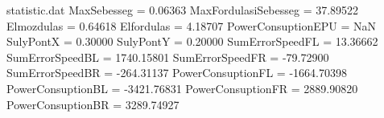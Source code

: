 \begin{filecontents*}{statistic.dat}
MaxSebesseg =    0.06363
MaxFordulasiSebesseg =   37.89522
Elmozdulas =    0.64618
Elfordulas =    4.18707
PowerConsuptionEPU =        NaN
SulyPontX =    0.30000
SulyPontY =    0.20000
SumErrorSpeedFL =   13.36662
SumErrorSpeedBL = 1740.15801
SumErrorSpeedFR =  -79.72900
SumErrorSpeedBR = -264.31137
PowerConsuptionFL = -1664.70398
PowerConsuptionBL = -3421.76831
PowerConsuptionFR = 2889.90820
PowerConsuptionBR = 3289.74927
\end{filecontents*}

